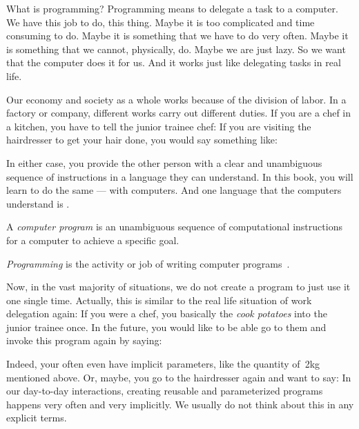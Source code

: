 %
What is programming?
Programming means to delegate a task to a computer.
We have this job to do, this thing.
Maybe it is too complicated and time consuming to do.
Maybe it is something that we have to do very often.
Maybe it is something that we cannot, physically, do.
Maybe we are just lazy.
So we want that the computer does it for us.
And it works just like delegating tasks in real life.

Our economy and society as a whole works because of the division of labor.
In a factory or company, different works carry out different duties.
If you are a chef in a kitchen, you have to tell the junior trainee chef:
If you are visiting the hairdresser to get your hair done, you would say something like:

In either case, you provide the other person with a clear and unambiguous sequence of instructions in a language they can understand.
In this book, you will learn to do the same --- with computers.
And one language that the computers understand is \python.
%
\begin{definition}%
A \emph{computer program} is an unambiguous sequence of computational instructions for a computer to achieve a specific goal.%
\end{definition}%
\begin{definition}[Programming]%
\label{def:programming}
\emph{Programming} is the activity or job of writing computer programs~\cite{CDE2024PMOPIE}.%
\end{definition}%
%
Now, in the vast majority of situations, we do not create a program to just use it one single time.
Actually, this is similar to the real life situation of work delegation again:
If you were a chef, you basically  the  \emph{cook potatoes} into the junior trainee once.
In the future, you would like to be able go to them and invoke this program again by saying:

Indeed, your  often even have implicit parameters, like the quantity of~2kg mentioned above.
Or, maybe, you go to the hairdresser again and want to say: 
In our day-to-day interactions, creating reusable and parameterized programs happens very often and very implicitly.
We usually do not think about this in any explicit terms.


